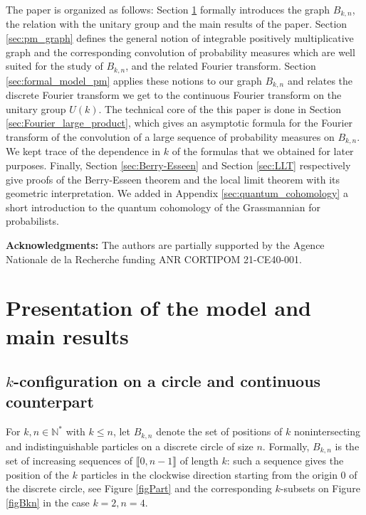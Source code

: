 \documentclass[10pt,11pt]{amsart}%
\begin{document}
The paper is organized as follows: Section \ref{sec:intro_model} formally introduces the graph $B_{k,n}$, the relation with the unitary group and the main results of the paper. Section \ref{sec:pm_graph} defines the general notion of integrable positively multiplicative graph and the corresponding convolution of probability measures which are well suited for the study of $B_{k,n}$, and the related Fourier transform. Section \ref{sec:formal_model_pm} applies these notions to our graph $B_{k,n}$ and relates the discrete Fourier transform we get to the continuous Fourier transform on the unitary group $U(k)$. The technical core of the this paper is done in Section \ref{sec:Fourier_large_product}, which gives an asymptotic formula for the Fourier transform of the convolution of a large sequence of probability measures on $B_{k,n}$. We kept trace of the dependence in $k$ of the formulas that we obtained for later purposes. Finally, Section \ref{sec:Berry-Esseen} and Section \ref{sec:LLT} respectively give proofs of the Berry-Esseen theorem and the local limit theorem with its geometric interpretation. We added in Appendix \ref{sec:quantum_cohomology} a short introduction to the quantum cohomology of the Grassmannian for probabilists.

\bigskip
\noindent\textbf{Acknowledgments:}  The authors are partially supported by the Agence Nationale de la Recherche funding ANR CORTIPOM 21-CE40-001.



\section{Presentation of the model and main results}
\label{sec:intro_model}
\subsection{$k$-configuration on a circle and continuous counterpart}\label{subsec:intro_model}

For $k,n\in \mathbb{N}^*$ with $k\leq n$, let $B_{k,n}$ denote the set of positions of $k$ nonintersecting and indistinguishable particles on a discrete circle of size $n$. Formally, $B_{k,n}$ is the set of increasing sequences of  $\llbracket 0,n-1\rrbracket$ of length $k$:  such a sequence gives the position of the $k$ particles in the clockwise direction starting from the origin $0$ of the discrete circle, see Figure \ref{figPart} and the corresponding $k$-subsets on Figure \ref{figBkn} in the case $k=2,n=4$.
\end{document}
